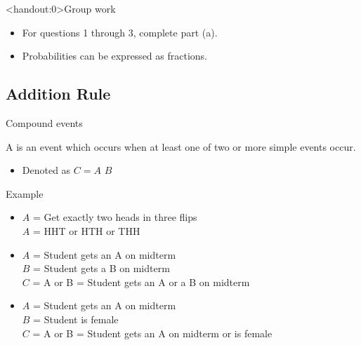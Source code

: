 \documentclass[xcolor=table, aspectratio=169, bigger]{beamer}
\begin{document}
\begin{frame}<handout:0>{Group work}
\begin{block}{}
\large
\begin{itemize}
\item For questions 1 through 3, complete part (a).
\item Probabilities can be expressed as fractions.
\end{itemize}
\end{block}
\end{frame}

%
%
\subsection{Addition Rule}

\begin{frame}{Compound events}
\begin{block}{}
A  is an event which occurs when at least one of two or more simple events occur.
\begin{itemize}
\pause
\item Denoted as $C = A$  $B$
\end{itemize}
\end{block}

\pause
\begin{exampleblock}{Example}
\begin{itemize}
\item $A$ = Get exactly two heads in three flips\\
$A$ = HHT or HTH or THH

\pause
\item $A$ = Student gets an A on midterm\\
$B$ = Student gets a B on midterm\\
$C$ = A or B = Student gets an A or a B on midterm

\pause
\item $A$ = Student gets an A on midterm\\
$B$ = Student is female\\
$C$ = A or B = Student gets an A on midterm or is female
\end{itemize}
\end{exampleblock}
\end{frame}
\end{document}
